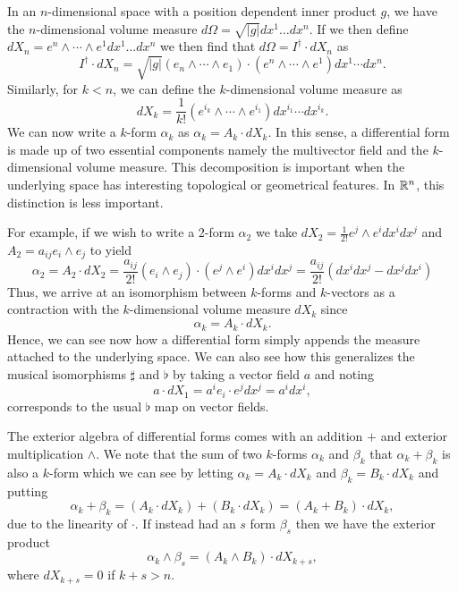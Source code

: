 \documentclass[12pt]{article}
\begin{document}
In an $n$-dimensional space with a position dependent inner product $g$, we have the $n$-dimensional volume measure $d\Omega = \sqrt{|g|} dx^1\dots dx^n$. If we then define $dX_n = e^n \wedge \cdots \wedge e^1 dx^1 \dots dx^n$ we then find that $d\Omega = I^\dagger \cdot dX_n$ as
\[
I^\dagger \cdot dX_n = \sqrt{|g|} (e_n \wedge \cdots \wedge e_1) \cdot (e^n \wedge \cdots \wedge e^1) dx^1 \cdots dx^n.
\]
Similarly, for $k<n$, we can define the $k$-dimensional volume measure as 
\[
dX_k = \frac{1}{k!}(e^{i_k}\wedge \cdots \wedge e^{i_1}) dx^{i_1} \cdots dx^{i_k}.
\]
We can now write a $k$-form $\alpha_k$ as $\alpha_k = A_k \cdot dX_k$. In this sense, a differential form is made up of two essential components namely the multivector field and the $k$-dimensional volume measure.  This decomposition is important when the underlying space has interesting topological or geometrical features. In $\mathbb{R}^n$, this distinction is less important. 

For example, if we wish to write a 2-form $\alpha_2$ we take $dX_2 = \frac{1}{2!} e^j \wedge e^i dx^i dx^j$ and $A_2 = a_{ij} e_i \wedge e_j$ to yield
\[
\alpha_2 = A_2 \cdot dX_2 = \frac{a_{ij}}{2!} (e_i \wedge e_j) \cdot (e^j \wedge e^i) dx^i dx^j = \frac{a_{ij}}{2!} (dx^i dx^j - dx^j dx^i)
\]
Thus, we arrive at an isomorphism between $k$-forms and $k$-vectors as a contraction with the $k$-dimensional volume measure $dX_k$ since
\[
\alpha_k = A_k \cdot dX_k.
\]
Hence, we can see now how a differential form simply appends the measure attached to the underlying space. We can also see how this generalizes the musical isomorphisms $\sharp$ and $\flat$ by taking a vector field $a$ and noting
\[
a \cdot dX_1 = a^i e_i \cdot e^j dx^j = a^i dx^i,
\]
corresponds to the usual $\flat$ map on vector fields.

The exterior algebra of differential forms comes with an addition $+$ and exterior multiplication $\wedge$.  We note that the sum of two $k$-forms $\alpha_k$ and $\beta_k$ that $\alpha_k+\beta_k$ is also a $k$-form which we can see by letting $\alpha_k = A_k \cdot dX_k$ and $\beta_k = B_k \cdot dX_k$ and putting
\[
\alpha_k + \beta_k = (A_k \cdot dX_k)+(B_k \cdot dX_k) = (A_k + B_k) \cdot dX_k,
\]
due to the linearity of $\cdot$.  If instead had an $s$ form $\beta_s$ then we have the exterior product
\[
\alpha_k \wedge \beta_s = (A_k \wedge B_k) \cdot dX_{k+s},
\]
where $dX_{k+s}=0$ if $k+s>n$.  
\end{document}
